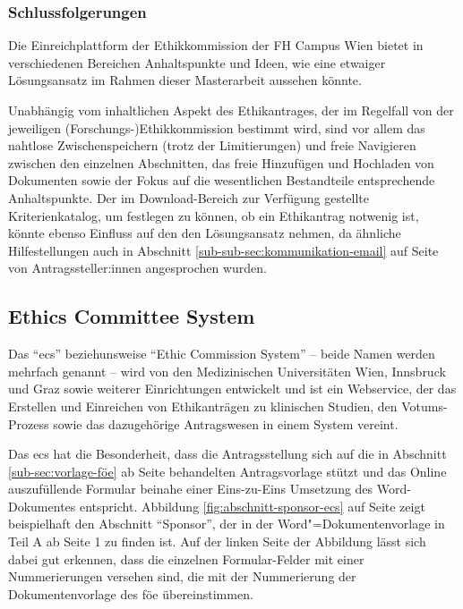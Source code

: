 \documentclass[a4paper,12pt,twoside]{scrreprt}
\begin{document}
\subsubsection*{Schlussfolgerungen}
\label{sub-sub-sec:schlussfolgerungen-fhcw}

Die Einreichplattform der Ethikkommission der FH Campus Wien bietet in verschiedenen Bereichen Anhaltspunkte und Ideen, wie eine etwaiger Lösungsansatz im Rahmen dieser Masterarbeit aussehen könnte.

Unabhängig vom inhaltlichen Aspekt des Ethikantrages, der im Regelfall von der jeweiligen (Forschungs-)Ethikkommission bestimmt wird, sind vor allem das nahtlose Zwischenspeichern (trotz der Limitierungen) und freie Navigieren zwischen den einzelnen Abschnitten, das freie Hinzufügen und Hochladen von Dokumenten sowie der Fokus auf die wesentlichen Bestandteile entsprechende Anhaltspunkte. Der im Download-Bereich zur Verfügung gestellte Kriterienkatalog, um festlegen zu können, ob ein Ethikantrag notwenig ist, könnte ebenso Einfluss auf den den Lösungsansatz nehmen, da ähnliche Hilfestellungen auch in Abschnitt \ref{sub-sub-sec:kommunikation-email} auf Seite \pageref{sub-sub-sec:kommunikation-email} von Antragssteller:innen angesprochen wurden.

\subsection{Ethics Committee System}
\label{sub-sec:ecs}

Das \enquote{\ac{ecs}} beziehunsweise \enquote{Ethic Commission System} -- beide Namen werden mehrfach genannt -- wird von den Medizinischen Universitäten Wien, Innsbruck und Graz sowie weiterer Einrichtungen entwickelt und ist ein Webservice, der das Erstellen und Einreichen von Ethikanträgen zu klinischen Studien, den Votums-Prozess sowie das dazugehörige Antragswesen in einem System vereint. \cite{medizinische_universitat_wien_ecs_2021-1}

\medskip

Das \ac{ecs} hat die Besonderheit, dass die Antragsstellung sich auf die in Abschnitt \ref{sub-sec:vorlage-föe} ab Seite \pageref{sub-sec:vorlage-föe} behandelten Antragsvorlage stützt und das Online auszufüllende Formular beinahe einer Eins-zu-Eins Umsetzung des Word-Dokumentes entspricht. Abbildung \ref{fig:abschnitt-sponsor-ecs} auf Seite \pageref{fig:abschnitt-sponsor-ecs} zeigt beispielhaft den Abschnitt \enquote{Sponsor}, der in der Word"=Dokumentenvorlage in Teil A ab Seite 1 zu finden ist. Auf der linken Seite der Abbildung lässt sich dabei gut erkennen, dass die einzelnen Formular-Felder mit einer Nummerierungen versehen sind, die mit der Nummerierung  der Dokumentenvorlage des \ac{föe} übereinstimmen.
\end{document}
